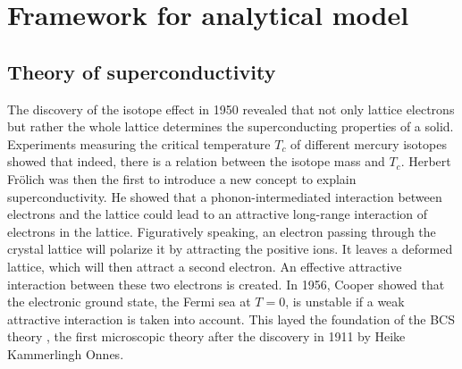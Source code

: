 \chapter{Framework for analytical model}
\label{ch:basics}

\section{Theory of superconductivity}

The discovery of the isotope effect in 1950 revealed that not only lattice electrons but rather the whole lattice determines the superconducting properties of a solid. Experiments measuring the critical temperature $T_c$ of different mercury isotopes showed that indeed, there is a relation between the isotope mass and $T_c$. Herbert Fr\"olich was then the first to introduce a new concept to explain superconductivity. He showed that a phonon-intermediated interaction between electrons and the lattice could lead to an attractive long-range interaction of electrons in the lattice. Figuratively speaking, an electron passing through the crystal lattice will polarize it by attracting the positive ions. It leaves a deformed lattice, which will then attract a second electron. An effective attractive interaction between these two electrons is created. %
In 1956, Cooper showed that the electronic ground state, the Fermi sea at $T = 0$, is unstable if a weak attractive interaction is taken into account. This layed the foundation of the BCS theory \cite{Bardeen1957}, the first microscopic theory after the discovery in 1911 by Heike Kammerlingh Onnes. 


